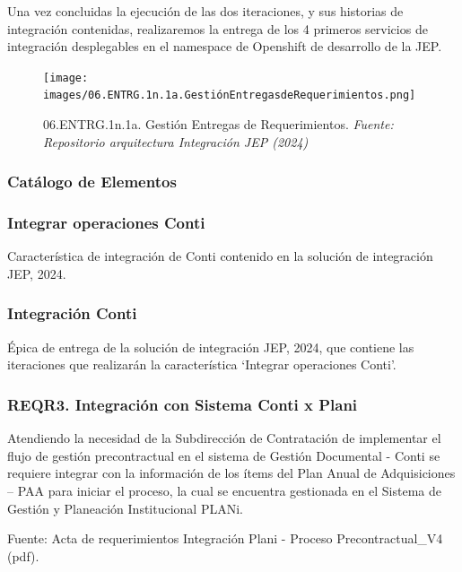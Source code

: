 \documentclass[
  paper=a4,
  ,captions=tableheading
]{scrartcl}
\begin{document}
Una vez concluidas la ejecución de las dos iteraciones, y sus historias
de integración contenidas, realizaremos la entrega de los 4 primeros
servicios de integración desplegables en el namespace de Openshift de
desarrollo de la JEP.

\begin{figure}
\centering
\texttt{[image: images/06.ENTRG.1n.1a.GestiónEntregasdeRequerimientos.png]}
\caption{06.ENTRG.1n.1a. Gestión Entregas de Requerimientos.
\emph{Fuente: Repositorio arquitectura Integración JEP
(2024)}}\label{fig:id-c31668d4d5dd44309f42fdd5fb2a7a53}
\end{figure}

\subsubsection{Catálogo de
Elementos}\label{sec:catuxe1logo-de-elementos-8}

\subsubsection{Integrar operaciones
Conti}\label{sec:integrar-operaciones-conti}

Característica de integración de Conti contenido en la solución de
integración JEP, 2024.

\subsubsection{Integración Conti}\label{sec:integraciuxf3n-conti}

Épica de entrega de la solución de integración JEP, 2024, que contiene
las iteraciones que realizarán la característica `Integrar operaciones
Conti'.

\subsubsection{REQR3. Integración con Sistema Conti x
Plani}\label{sec:reqr3.-integraciuxf3n-con-sistema-conti-x-plani-1}

Atendiendo la necesidad de la Subdirección de Contratación de
implementar el flujo de gestión precontractual en el sistema de Gestión
Documental - Conti se requiere integrar con la información de los ítems
del Plan Anual de Adquisiciones -- PAA para iniciar el proceso, la cual
se encuentra gestionada en el Sistema de Gestión y Planeación
Institucional PLANi.

Fuente: Acta de requerimientos Integración Plani - Proceso
Precontractual\_V4 (pdf).
\end{document}
